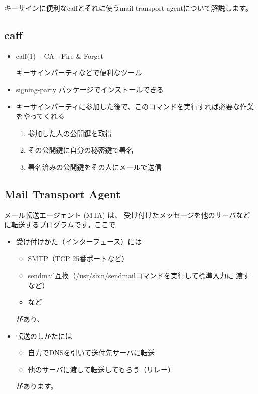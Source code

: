 \documentclass[mingoth,a4paper]{jsarticle}
\begin{document}


キーサインに便利なcaffとそれに使うmail-transport-agentについて解説します。

\subsection{caff}
\begin{itemize}
 \item caff(1) -- CA - Fire \& Forget

 キーサインパーティなどで便利なツール

 \item 
 signing-party パッケージでインストールできる

 \item 
 キーサインパーティに参加した後で、このコマンドを実行すれば必要な作業をやってくれる

 

 \begin{enumerate}
  \item 参加した人の公開鍵を取得
  \item その公開鍵に自分の秘密鍵で署名
  \item 署名済みの公開鍵をその人にメールで送信
 \end{enumerate}

\end{itemize}
  


\subsection{Mail Transport Agent}
 メール転送エージェント (MTA)
は、
 受け付けたメッセージを他のサーバなどに転送するプログラムです。ここで
 
 \begin{itemize}
  \item 受け付けかた（インターフェース）には
	\begin{itemize}
	 \item SMTP（TCP 25番ポートなど）
	 \item sendmail互換（/usr/sbin/sendmailコマンドを実行して標準入力に
	       渡すなど）
	 \item など
	\end{itemize}
 があり、
  \item 転送のしかたには
	\begin{itemize}
	 \item 自力でDNSを引いて送付先サーバに転送
	 \item 他のサーバに渡して転送してもらう（リレー）
	\end{itemize}
	があります。
 \end{itemize}
 
\end{document}
